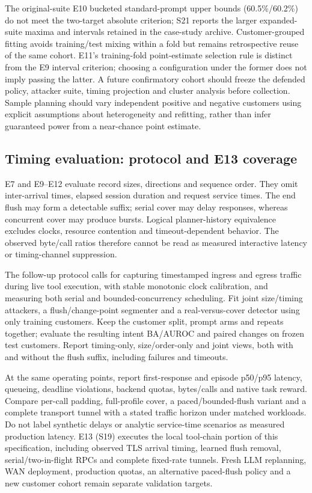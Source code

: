 The original-suite E10 bucketed standard-prompt upper bounds (60.5\%/60.2\%) do not meet the two-target absolute criterion; S21 reports the larger expanded-suite maxima and intervals retained in the case-study archive. Customer-grouped fitting avoids training/test mixing within a fold but remains retrospective reuse of the same cohort. E11's training-fold point-estimate selection rule is distinct from the E9 interval criterion; choosing a configuration under the former does not imply passing the latter. A future confirmatory cohort should freeze the defended policy, attacker suite, timing projection and cluster analysis before collection. Sample planning should vary independent positive and negative customers using explicit assumptions about heterogeneity and refitting, rather than infer guaranteed power from a near-chance point estimate.

\subsection{Timing evaluation: protocol and E13 coverage}
E7 and E9--E12 evaluate record sizes, directions and sequence order. They omit inter-arrival times, elapsed session duration and request service times. The end flush may form a detectable suffix; serial cover may delay responses, whereas concurrent cover may produce bursts. Logical planner-history equivalence excludes clocks, resource contention and timeout-dependent behavior. The observed byte/call ratios therefore cannot be read as measured interactive latency or timing-channel suppression.

The follow-up protocol calls for capturing timestamped ingress and egress traffic during live tool execution, with stable monotonic clock calibration, and measuring both serial and bounded-concurrency scheduling. Fit joint size/timing attackers, a flush/change-point segmenter and a real-versus-cover detector using only training customers. Keep the customer split, prompt arms and repeats together; evaluate the resulting intent BA/AUROC and paired changes on frozen test customers. Report timing-only, size/order-only and joint views, both with and without the flush suffix, including failures and timeouts.

At the same operating points, report first-response and episode p50/p95 latency, queueing, deadline violations, backend quotas, bytes/calls and native task reward. Compare per-call padding, full-profile cover, a paced/bounded-flush variant and a complete transport tunnel with a stated traffic horizon under matched workloads. Do not label synthetic delays or analytic service-time scenarios as measured production latency. E13 (S19) executes the local tool-chain portion of this specification, including observed TLS arrival timing, learned flush removal, serial/two-in-flight RPCs and complete fixed-rate tunnels. Fresh LLM replanning, WAN deployment, production quotas, an alternative paced-flush policy and a new customer cohort remain separate validation targets.
